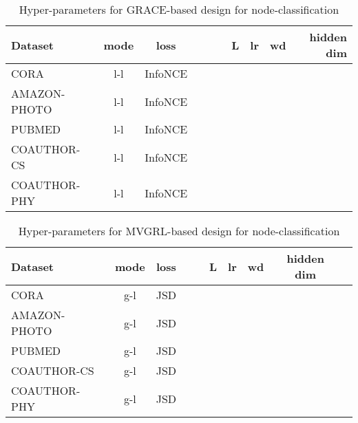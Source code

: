 \documentclass{article}
\theoremstyle{plain}
\theoremstyle{definition}
\theoremstyle{remark}
\begin{document}
\begin{table}[H]
\centering
\caption{Hyper-parameters for GRACE-based design for node-classification}
\label{table:hp_grace}
\vskip 0.15in
\begin{center}
\begin{small}
\begin{sc}
\begin{tabular}{lccccccccr}
\toprule
Dataset & mode & loss &  &  &  & L & lr & wd & hidden dim \\
\midrule
CORA & l-l & InfoNCE &  &  &  &  &  &  & \\
AMAZON-PHOTO & l-l & InfoNCE &  &  &  &  &  &  & \\ 
PUBMED & l-l & InfoNCE &  &  &  &  &  &  & \\
COAUTHOR-CS & l-l & InfoNCE &  &  &  &  &  &  & \\
COAUTHOR-PHY & l-l & InfoNCE &  &  &  &  &  &  & \\
\bottomrule
\end{tabular}
\end{sc}
\end{small}
\end{center}
\vskip -0.1in
\end{table}

\begin{table}[H]
\centering
\caption{Hyper-parameters for MVGRL-based design for node-classification}
\label{table:hp_mvgrl}
\vskip 0.15in
\begin{center}
\begin{small}
\begin{sc}
\begin{tabular}{lccccccccr}
\toprule
Dataset & mode & loss &  &  & L & lr & wd & hidden dim \\
\midrule
CORA & g-l & JSD &  &  &   &  &  & \\
AMAZON-PHOTO & g-l & JSD &  &  &  &  &  & \\
PUBMED & g-l & JSD &  &  &  &  &  & \\
COAUTHOR-CS & g-l & JSD &  &  &  &  &  & \\
COAUTHOR-PHY & g-l & JSD &  &  &  &  &  & \\
\bottomrule
\end{tabular}
\end{sc}
\end{small}
\end{center}
\vskip -0.1in
\end{table}
\end{document}
